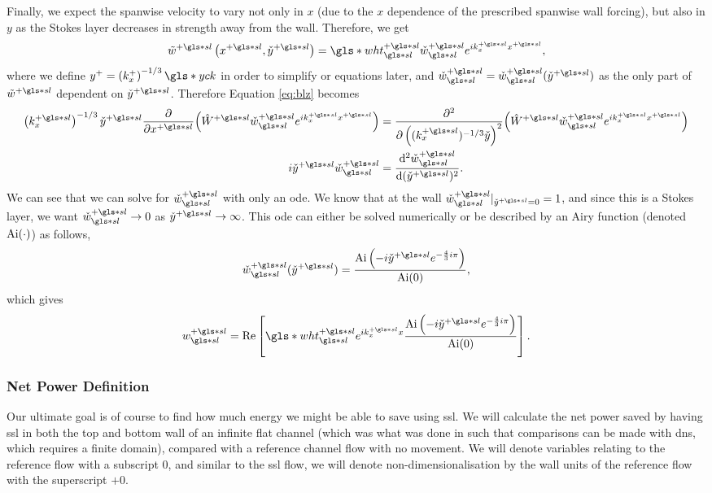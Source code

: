 Finally, we expect the spanwise velocity to vary not only in $x$ (due to the  $x$ dependence of the prescribed spanwise wall forcing), but also in  $y$ as the Stokes layer decreases in strength away from the wall. Therefore, we get
\begin{equation}
	\tilde{w}\ps\left(x\ps,\check{y}\ps\right)=\gls*{wht}\ps\ssl\check{w}\ssl\ps e^{ik\ps_x x\ps}\label{eq:wtlddef}
,\end{equation}
where we define $y^{+}=\left(k^{+}_x\right)^{-1 /3}\gls*{yck}$ in order to simplify or equations later, and $\check{w}\ssl \ps=\check{w}\ssl \ps(\check{y}\ps)$ as the only part of $\tilde{w}\ps$ dependent on $\check{y}\ps$.
Therefore Equation \eqref{eq:blz} becomes
\begin{align}
	\left( k_x\ps \right) ^{-1 /3} \check{y}\ps \pdv{x\ps}(\hat{W}\ps \check{w}\ps\ssl e^{ik_x\ps x\ps})&= \pdv[2]{\left( (k_x\ps)^{-1 /3}\check{y} \right) }(\hat{W}\ps \check{w}\ps\ssl e^{ik_x\ps x\ps})\nonumber\\
	i \check{y}\ps \check{w}\ps\ssl &= \dv[2]{\check{w}\ps\ssl}{(\check{y}\ps)} 
.\end{align}
We can see that we can solve for $\check{w}\ps\ssl$ with only an \gls{ode}. We know that at the wall $\check{w}\ps\ssl\rvert_{\check{y}\ps=0}=1$, and since this is a Stokes layer, we want $\check{w}\ps\ssl \to 0$ as $\check{y}\ps\to \infty$. This \gls{ode} can either be solved numerically or be described by an Airy function (denoted $\operatorname{Ai} (\cdot)$) as follows,
 \begin{equation}
	 \check{w}\ps\ssl(\check{y}\ps)= \frac{\Ai\left(-i \check{y}\ps e ^{-\frac{4}{3}i\pi}\right)}{\Ai(0)}\label{eq:wchecksoln}
,\end{equation}
which gives
\begin{equation}
	w\ps\ssl = \Re \left[ \gls*{wht}\ps\ssl e^{i k_{x}\ps x}\frac{\Ai\left(-i \check{y}\ps e ^{-\frac{4}{3}i\pi}\right)}{\Ai(0)}\right] 
.\end{equation}

\subsubsection{Net Power Definition}
Our ultimate goal is of course to find how much energy we might be able to save using \gls{ssl}. We will calculate the net power saved by having \gls{ssl} in both the top and bottom wall of an infinite flat channel (which was what was done in \textcite{viotti2009} such that comparisons can be made with \gls{dns}, which requires a finite domain), compared with a reference channel flow with no movement. We will denote variables relating to the reference flow with a subscript 0, and similar to the \gls{ssl} flow, we will denote non-dimensionalisation by the wall units of the reference flow with the superscript $+0$.

